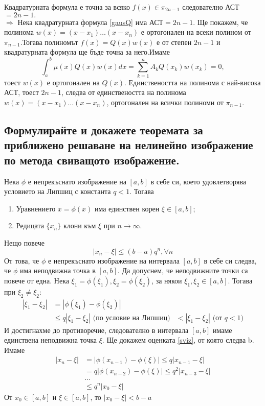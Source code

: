 \documentclass[12pt]{article}
\numberwithin{equation}{subsection}
\numberwithin{theorem}{subsection}
\numberwithin{definition}{subsection}
\numberwithin{corollary}{subsection}
\begin{document}
  Квадратурната формула е точна за всяко $f(x)\in\pi_{2n-1}$ следователно АСТ$=2n-1.$\\
  $\Rightarrow$
  Нека квадратурната формула \ref{gausQ} има АСТ$=2n-1$. Ще покажем, че полинома $w(x)=(x-x_1)\ldots(x-x_n)$ е ортогонален на всеки полином от $\pi_{n-1}$.Тогава полиномът $f(x)=Q(x)w(x)$ е от степен $2n-1$ и квадратурната формула ще бъде точна за него.Имаме
  \begin{equation*}
    \int_{a}^{b}\mu(x)Q(x)w(x)dx=\sum_{k=1}^{n}A_kQ(x_k)w(x_k)=0,
  \end{equation*}
  тоест $w(x)$ е ортогонален на $Q(x)$.
  Единствеността на полинома с най-висока АСТ,  тоест $2n-1$, следва от единствеността на полинома $w(x)=(x-x_1)\ldots(x-x_n)$, ортогонален на всички полиноми от $\pi_{n-1}$.
\subsection{Формулирайте и докажете теоремата за приближено решаване
на нелинейно изображение по метода свиващото изображение.}
  \theorem Нека $\phi$ е непрекъснато изображение на $[a,b]$ в себе си, което удовлетворява условието на Липшиц с константа $q<1$. Тогава
  \begin{enumerate}[a]
    \item{Уравнението $x=\phi(x)$ има единствен корен $\xi\in[a,b]$;}
    \item{Редицата $\{x_n\}$ клони към $\xi$ при $n\rightarrow\infty$.}
  \end{enumerate}
  Нещо повече
  \begin{equation}\label{sviz}
    |x_n-\xi|\leq(b-a)q^n, \forall n
  \end{equation}
  \proof
    От това, че $\phi$ е непрекъснато изображение на интервала $[a,b]$ в себе си следва, че $\phi$ има неподвижна точка в $[a,b].$
    Да допуснем, че неподвижните точки са повече от една. Нека $\xi_1=\phi(\xi_1),\xi_2=\phi(\xi_2)$, за някои $\xi_1,\xi_2\in[a,b]$. Тогава при $\xi_2\neq\xi_2$:
    \begin{align*}
      |\xi_1-\xi_2|&=|\phi(\xi_1)-\phi(\xi_2)|\\
                   &\leq q|\xi_1-\xi_2|\text{ (по условие на Липшиц)}
                   &<|\xi_1-\xi_2|\text{ (от $q<1$)}
    \end{align*}
    И достигнахме до противоречие, следователно в интервала $[a,b]$ имаме единствена неподвижна точка $\xi$.
    Ще докажем оценката \ref{sviz}, от която следва b. Имаме
    \begin{align*}
      |x_n - \xi|&=|\phi(x_{n-1})-\phi(\xi)|\leq q|x_{n-1}-\xi|\\
                 &=q|\phi(x_{n-2})-\phi(\xi)|\leq q^2|x_{n-3}-\xi|\\
                 &\ldots\\
                 &\leq q^n|x_0-\xi|
    \end{align*}
    От $x_0\in[a,b]$ и $\xi\in[a,b]$, то $|x_0-\xi|<b-a$
\end{document}
